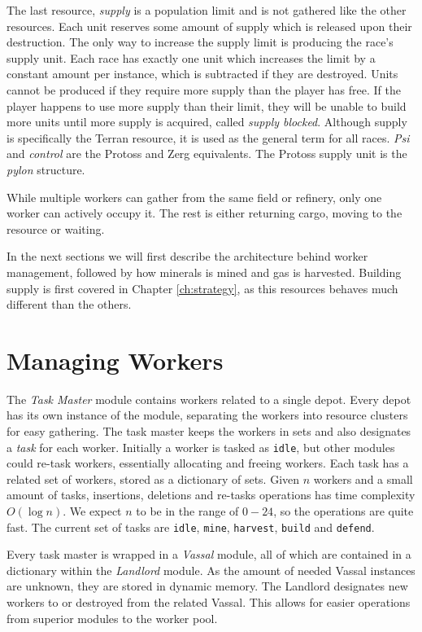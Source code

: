 The last resource, \emph{supply} is a population limit and is not gathered like the other resources. Each unit reserves some amount of supply which is released upon their destruction. The only way to increase the supply limit is producing the race's supply unit. Each race has exactly one unit which increases the limit by a constant amount per instance, which is subtracted if they are destroyed. Units cannot be produced if they require more supply than the player has free. If the player happens to use more supply than their limit, they will be unable to build more units until more supply is acquired, called \emph{supply blocked}. Although supply is specifically the Terran resource, it is used as the general term for all races. \emph{Psi} and \emph{control} are the Protoss and Zerg equivalents. The Protoss supply unit is the \emph{pylon} structure.

While multiple workers can gather from the same field or refinery, only one worker can actively occupy it. The rest is either returning cargo, moving to the resource or waiting.

In the next sections we will first describe the architecture behind worker management, followed by how minerals is mined and gas is harvested. Building supply is first covered in Chapter \ref{ch:strategy}, as this resources behaves much different than the others.

\section{Managing Workers}
\label{sec:manageWorkers}
The \emph{Task Master} module contains workers related to a single depot. Every depot has its own instance of the module, separating the workers into resource clusters for easy gathering. The task master keeps the workers in sets and also designates a \emph{task} for each worker. Initially a worker is tasked as \texttt{idle}, but other modules could re-task workers, essentially allocating and freeing workers. Each task has a related set of workers, stored as a dictionary of sets. Given $n$ workers and a small amount of tasks, insertions, deletions and re-tasks operations has time complexity $O(\log n)$. We expect $n$ to be in the range of $0-24$, so the operations are quite fast. The current set of tasks are \texttt{idle}, \texttt{mine}, \texttt{harvest}, \texttt{build} and \texttt{defend}.

Every task master is wrapped in a \emph{Vassal} module, all of which are contained in a dictionary within the \emph{Landlord} module. As the amount of needed Vassal instances are unknown, they are stored in dynamic memory. The Landlord designates new workers to or destroyed from the related Vassal. This allows for easier operations from superior modules to the worker pool.

